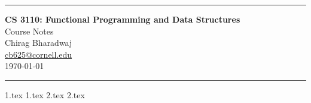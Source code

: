 \documentclass[10pt]{article}
\begin{document}
\begin{center}
    \hrule
    \vspace{\baselineskip}
    \noindent
    \LARGE{\textbf{CS 3110: Functional Programming and Data Structures}} \\
    \Large{Course Notes} \\
    \vspace{\baselineskip}
    \large{Chirag Bharadwaj} \\
    \large{\href{mailto:cb625@cornell.edu}{\textsf{cb625@cornell.edu}}} \\
    \vspace{\baselineskip}
    \large{\thedate\today} \\
    \vspace{\baselineskip}
    \hrule
\end{center}

{1.tex}
{1.tex}
{2.tex}
{2.tex}
\end{document}
